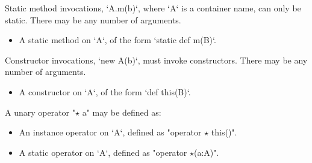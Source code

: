 Static method invocations, \xcd`A.m(b)`, where \xcd`A` is a container name,
can only be static.  There may be any number of arguments.
\begin{itemize}
\item A static method on \xcd`A`, of the form \xcd`static def m(B)`.
\end{itemize}


Constructor invocations, \xcd`new A(b)`, must invoke constructors. There may
be any number of arguments. 
\begin{itemize}
\item A constructor on \xcd`A`, of the form \xcd`def this(B)`.
\end{itemize}


A unary operator \xcdmath"$\star$ a" may be defined as: 
\begin{itemize}
\item An instance operator on \xcd`A`, defined as 
      \xcdmath"operator $\star$ this()".
\item A static operator on \xcd`A`, defined as 
      \xcdmath"operator $\star$(a:A)".
\end{itemize}

